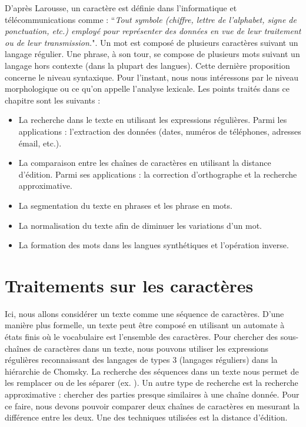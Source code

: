 \documentclass{KodeBook}
\begin{document}
D'après Larousse, un caractère est définie dans l'informatique et télécommunications comme : ``\textit{Tout symbole (chiffre, lettre de l'alphabet, signe de ponctuation, etc.) employé pour représenter des données en vue de leur traitement ou de leur transmission.}".
Un mot est composé de plusieurs caractères suivant un langage régulier. 
Une phrase, à son tour, se compose de plusieurs mots suivant un langage hors contexte (dans la plupart des langues). 
Cette dernière proposition concerne le niveau syntaxique.
Pour l'instant, nous nous intéressons par le niveau morphologique ou ce qu'on appelle l'analyse lexicale.
Les points traités dans ce chapitre sont les suivants : 
\begin{itemize}
	\item La recherche dans le texte en utilisant les expressions régulières. 
	Parmi les applications : l'extraction des données (dates, numéros de téléphones, adresses émail, etc.).
	
	\item La comparaison entre les chaînes de caractères en utilisant la distance d'édition. 
	Parmi ses applications : la correction d'orthographe et la recherche approximative.
	
	\item La segmentation du texte en phrases et les phrase en mots. 
	
	\item La normalisation du texte afin de diminuer les variations d'un mot.
	
	\item La formation des mots dans les langues synthétiques et l'opération inverse.
\end{itemize}

\section{Traitements sur les caractères}

Ici, nous allons considérer un texte comme une séquence de caractères. 
D'une manière plus formelle, un texte peut être composé en utilisant un automate à états finis où le vocabulaire est l'ensemble des caractères. 
Pour chercher des sous-chaînes de caractères dans un texte, nous pouvons utiliser les expressions régulières reconnaissant des langages de types 3 (langages réguliers) dans la hiérarchie de Chomsky. 
La recherche des séquences dans un texte nous permet de les remplacer ou de les séparer (ex. ).
Un autre type de recherche est la recherche approximative : chercher des parties presque similaires à une chaîne donnée. 
Pour ce faire, nous devons pouvoir comparer deux chaînes de caractères en mesurant la différence entre les deux. 
Une des techniques utilisées est la distance d'édition.
\end{document}
